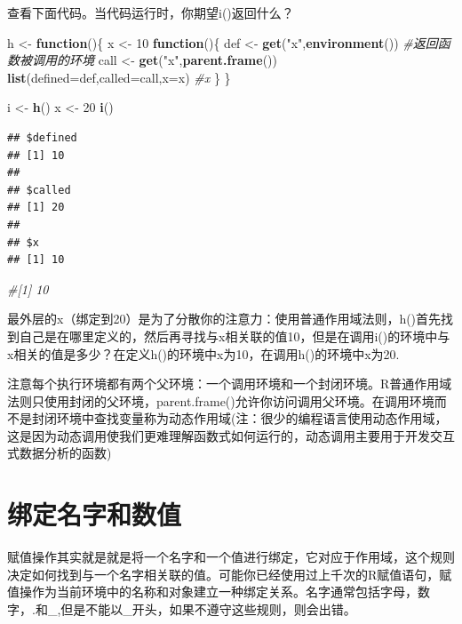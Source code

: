\documentclass[]{book}
\newenvironment{Shaded}{\begin{snugshade}}{\end{snugshade}}
\newcommand{\KeywordTok}[1]{\textcolor[rgb]{0.13,0.29,0.53}{\textbf{#1}}}
\newcommand{\DataTypeTok}[1]{\textcolor[rgb]{0.13,0.29,0.53}{#1}}
\newcommand{\DecValTok}[1]{\textcolor[rgb]{0.00,0.00,0.81}{#1}}
\newcommand{\StringTok}[1]{\textcolor[rgb]{0.31,0.60,0.02}{#1}}
\newcommand{\CommentTok}[1]{\textcolor[rgb]{0.56,0.35,0.01}{\textit{#1}}}
\newcommand{\ControlFlowTok}[1]{\textcolor[rgb]{0.13,0.29,0.53}{\textbf{#1}}}
\newcommand{\NormalTok}[1]{#1}
\begin{document}
查看下面代码。当代码运行时，你期望i()返回什么？

\begin{Shaded}
\begin{Highlighting}[]
\NormalTok{h <-}\StringTok{ }\ControlFlowTok{function}\NormalTok{()\{}
\NormalTok{  x <-}\StringTok{ }\DecValTok{10}
  \ControlFlowTok{function}\NormalTok{()\{}
\NormalTok{    def <-}\StringTok{ }\KeywordTok{get}\NormalTok{(}\StringTok{"x"}\NormalTok{,}\KeywordTok{environment}\NormalTok{())}
    \CommentTok{#返回函数被调用的环境}
\NormalTok{    call <-}\StringTok{ }\KeywordTok{get}\NormalTok{(}\StringTok{"x"}\NormalTok{,}\KeywordTok{parent.frame}\NormalTok{())}
    \KeywordTok{list}\NormalTok{(}\DataTypeTok{defined=}\NormalTok{def,}\DataTypeTok{called=}\NormalTok{call,}\DataTypeTok{x=}\NormalTok{x)}
    \CommentTok{#x}
\NormalTok{  \}}
\NormalTok{\}}

\NormalTok{i <-}\StringTok{ }\KeywordTok{h}\NormalTok{()}
\NormalTok{x <-}\StringTok{ }\DecValTok{20}
\KeywordTok{i}\NormalTok{()}
\end{Highlighting}
\end{Shaded}

\begin{verbatim}
## $defined
## [1] 10
## 
## $called
## [1] 20
## 
## $x
## [1] 10
\end{verbatim}

\begin{Shaded}
\begin{Highlighting}[]
\CommentTok{#[1] 10}
\end{Highlighting}
\end{Shaded}

最外层的x（绑定到20）是为了分散你的注意力：使用普通作用域法则，h()首先找到自己是在哪里定义的，然后再寻找与x相关联的值10，但是在调用i()的环境中与x相关的值是多少？在定义h()的环境中x为10，在调用h()的环境中x为20.

注意每个执行环境都有两个父环境：一个调用环境和一个封闭环境。R普通作用域法则只使用封闭的父环境，parent.frame()允许你访问调用父环境。在调用环境而不是封闭环境中查找变量称为动态作用域(注：很少的编程语言使用动态作用域，这是因为动态调用使我们更难理解函数式如何运行的，动态调用主要用于开发交互式数据分析的函数)

\section{绑定名字和数值}

赋值操作其实就是就是将一个名字和一个值进行绑定，它对应于作用域，这个规则决定如何找到与一个名字相关联的值。可能你已经使用过上千次的R赋值语句，赋值操作为当前环境中的名称和对象建立一种绑定关系。名字通常包括字母，数字，.和\_,但是不能以\_开头，如果不遵守这些规则，则会出错。
\end{document}
